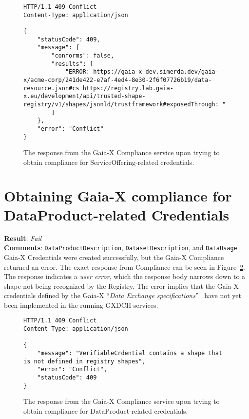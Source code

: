 \begin{figure}[h]
    \centering
    \begin{verbatim}
HTTP/1.1 409 Conflict
Content-Type: application/json

{
	"statusCode": 409,
	"message": {
		"conforms": false,
		"results": [
			"ERROR: https://gaia-x-dev.simerda.dev/gaia-x/acme-corp/241de422-e7af-4ed4-8e30-2f6f07726b19/data-resource.json#cs https://registry.lab.gaia-x.eu/development/api/trusted-shape-registry/v1/shapes/jsonld/trustframework#exposedThrough: "
		]
	},
	"error": "Conflict"
}
    \end{verbatim}
    \caption{The response from the Gaia-X Compliance service upon trying to obtain compliance for ServiceOffering-related credentials.}\label{fig:service_offering_compliance_response}
\end{figure}

\section[Data Product Compliance]{Obtaining Gaia-X compliance for DataProduct-related Credentials}\label{sec:obtaining-gaia-x-compliance-for-dataproduct-related-credentials}

\textbf{Result}: \textit{Fail}
\\
\textbf{Comments}: \texttt{DataProductDescription}, \texttt{DatasetDescription}, and \texttt{DataUsage} Gaia-X Credentials were created successfully, but the Gaia-X Compliance returned an error.
The exact response from Compliance can be seen in Figure~\ref{fig:data_product_compliance_response}.
The response indicates a \textit{user error}, which the response body narrows down to a shape not being recognized by the Registry.
The error implies that the Gaia-X credentials defined by the Gaia-X ``\textit{Data Exchange specifications}''~\cite{gaiax_data_exchange_document} have not yet been implemented in the running GXDCH services.

\begin{figure}[h]
	\centering
	\begin{verbatim}
HTTP/1.1 409 Conflict
Content-Type: application/json

{
	"message": "VerifiableCrdential contains a shape that is not defined in registry shapes",
	"error": "Conflict",
	"statusCode": 409
}
	\end{verbatim}
	\caption{The response from the Gaia-X Compliance service upon trying to obtain compliance for DataProduct-related credentials.}\label{fig:data_product_compliance_response}
\end{figure}

